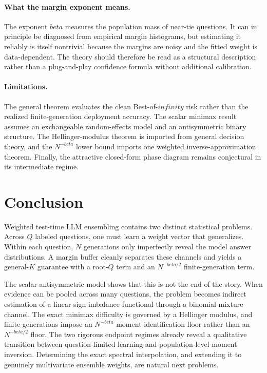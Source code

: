 \documentclass[11pt]{article}
\def\beta{beta}%
\def\infty{infinity}%
\newcommand\ced[1]{{\color{teal!70!black} #1}}
\begin{document}
\paragraph{What the margin exponent means.}
The exponent $\beta$ measures the population mass of near-tie questions.  It can in principle be diagnosed from empirical margin histograms, but estimating it reliably is itself nontrivial because the margins are noisy and the fitted weight is data-dependent.  The theory should therefore be read as a structural description rather than a plug-and-play confidence formula without additional calibration.

\paragraph{Limitations.}
The general theorem evaluates the clean Best-of-$\infty$ risk rather than the realized finite-generation deployment accuracy.  The scalar minimax result assumes an exchangeable random-effects model and an antisymmetric binary structure.  The Hellinger-modulus theorem is imported from general decision theory, and the $N^{-\beta}$ lower bound imports one weighted inverse-approximation theorem.  Finally, the attractive closed-form phase diagram remains conjectural in its intermediate regime.

\section{Conclusion}

Weighted test-time LLM ensembling contains two distinct statistical problems.  Across $Q$ labeled questions, one must learn a weight vector that generalizes.  Within each question, $N$ generations only imperfectly reveal the model answer distributions.  A margin buffer cleanly separates these channels and yields a general-$K$ guarantee with a root-$Q$ term and an $N^{-\beta/2}$ finite-generation term.

The scalar antisymmetric model shows that this is not the end of the story.  When evidence can be pooled across many questions, the problem becomes indirect estimation of \ced{a linear sign-imbalance functional} through a binomial-mixture channel.  The exact minimax difficulty is governed by a Hellinger modulus, and finite generations impose an $N^{-\beta}$ moment-identification floor rather than an $N^{-\beta/2}$ floor.  The two rigorous endpoint regimes already reveal a qualitative transition between question-limited learning and population-level moment inversion.  Determining the exact spectral interpolation, and extending it to genuinely multivariate ensemble weights, are natural next problems.
\end{document}
